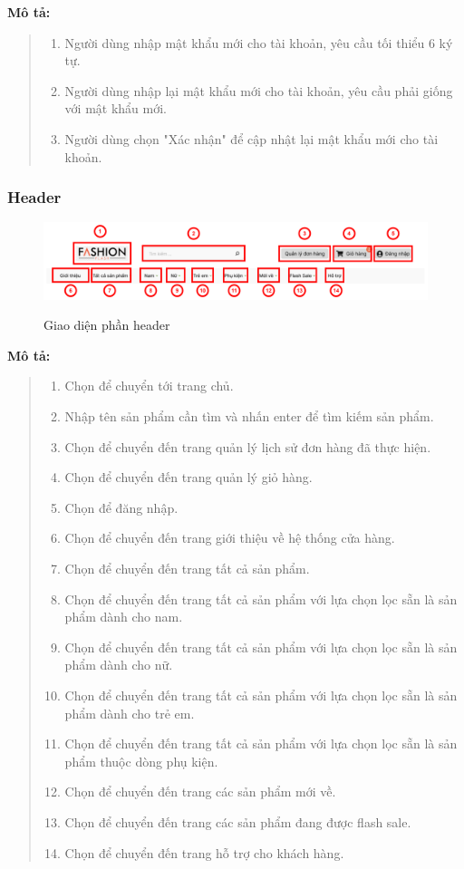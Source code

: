 \textbf{Mô tả:}
\begin{quote}
    \begin{enumerate}
        \item Người dùng nhập mật khẩu mới cho tài khoản, yêu cầu tối thiểu 6 ký tự.
        \item Người dùng nhập lại mật khẩu mới cho tài khoản, yêu cầu phải giống với mật khẩu mới.
        \item Người dùng chọn "Xác nhận" để cập nhật lại mật khẩu mới cho tài khoản.
    \end{enumerate}
\end{quote}

\subsubsection{Header}
\begin{figure}[!htp]
    \centering
    \includegraphics[width=5in]{img/UI/customer/header.png}
    \label{6}
    \newline
    \caption{Giao diện phần header}
\end{figure}
\textbf{Mô tả:}
\begin{quote}
    \begin{enumerate}
        \item Chọn để chuyển tới trang chủ.
        \item Nhập tên sản phẩm cần tìm và nhấn enter để tìm kiếm sản phẩm.
        \item Chọn để chuyển đến trang quản lý lịch sử đơn hàng đã thực hiện.
        \item Chọn để chuyển đến trang quản lý giỏ hàng.
        \item Chọn để đăng nhập.
        \item Chọn để chuyển đến trang giới thiệu về hệ thống cửa hàng.
        \item Chọn để chuyển đến trang tất cả sản phẩm.
        \item Chọn để chuyển đến trang tất cả sản phẩm với lựa chọn lọc sẵn là sản phẩm dành cho nam.
        \item Chọn để chuyển đến trang tất cả sản phẩm với lựa chọn lọc sẵn là sản phẩm dành cho nữ.
        \item Chọn để chuyển đến trang tất cả sản phẩm với lựa chọn lọc sẵn là sản phẩm dành cho trẻ em.
        \item Chọn để chuyển đến trang tất cả sản phẩm với lựa chọn lọc sẵn là sản phẩm thuộc dòng phụ kiện.
        \item Chọn để chuyển đến trang các sản phẩm mới về.
        \item Chọn để chuyển đến trang các sản phẩm đang được flash sale.
        \item Chọn để chuyển đến trang hỗ trợ cho khách hàng.
    \end{enumerate}
\end{quote}

